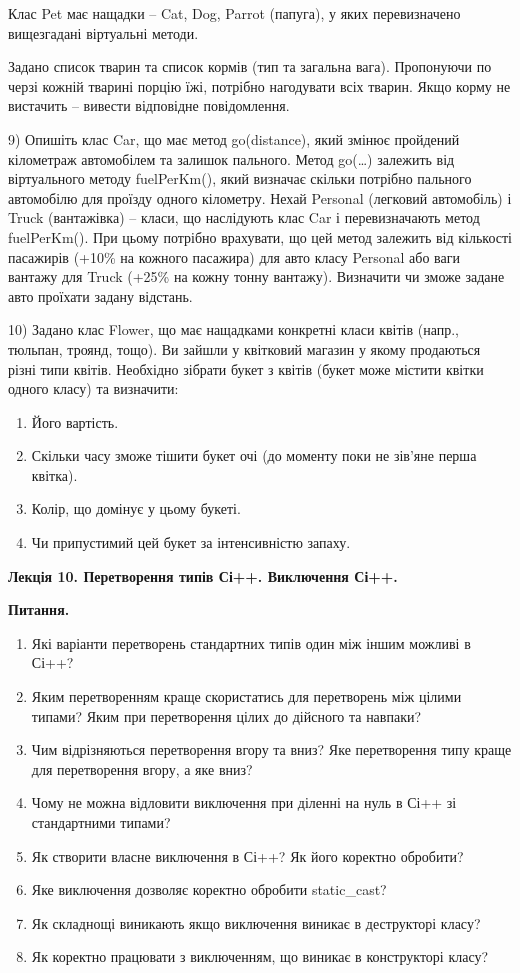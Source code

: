 \documentclass[]{article}
\begin{document}
Клас Pet має нащадки -- Cat, Dog, Parrot (папуга), у яких перевизначено
вищезгадані віртуальні методи.

Задано список тварин та список кормів (тип та загальна вага). Пропонуючи
по черзі кожній тварині порцію їжі, потрібно нагодувати всіх тварин.
Якщо корму не вистачить -- вивести відповідне повідомлення.

9) Опишіть клас Car, що має метод go(distance), який змінює пройдений
кілометраж автомобілем та залишок пального. Метод go(\ldots{}) залежить
від віртуального методу fuelPerKm(), який визначає скільки потрібно
пального автомобілю для проїзду одного кілометру. Нехай Personal
(легковий автомобіль) і Truck (вантажівка) -- класи, що наслідують клас
Car і перевизначають метод fuelPerKm(). При цьому потрібно врахувати, що
цей метод залежить від кількості пасажирів (+10\% на кожного пасажира)
для авто класу Personal або ваги вантажу для Truck (+25\% на кожну тонну
вантажу). Визначити чи зможе задане авто проїхати задану відстань.

10) Задано клас Flower, що має нащадками конкретні класи квітів (напр.,
тюльпан, троянд, тощо). Ви зайшли у квітковий магазин у якому продаються
різні типи квітів. Необхідно зібрати букет з квітів (букет може містити
квітки одного класу) та визначити:

\begin{enumerate}
\def\labelenumi{\arabic{enumi}.}
\item
  Його вартість.
\item
  Скільки часу зможе тішити букет очі (до моменту поки не зів'яне перша
  квітка).
\item
  Колір, що домінує у цьому букеті.
\item
  Чи припустимий цей букет за інтенсивністю запаху.
\end{enumerate}

\protect\hypertarget{_Hlk54461890}{}{}\textbf{Лекція 10. Перетворення
типів Сі++. Виключення Сі++.}

\protect\hypertarget{_Hlk57988995}{}{}\textbf{Питання.}

\begin{enumerate}
\def\labelenumi{\arabic{enumi})}
\item
  Які варіанти перетворень стандартних типів один між іншим можливі в
  Сі++?
\item
  Яким перетворенням краще скористатись для перетворень між цілими
  типами? Яким при перетворення цілих до дійсного та навпаки?
\item
  Чим відрізняються перетворення вгору та вниз? Яке перетворення типу
  краще для перетворення вгору, а яке вниз?
\item
  Чому не можна відловити виключення при діленні на нуль в Сі++ зі
  стандартними типами?
\item
  Як створити власне виключення в Сі++? Як його коректно обробити?
\item
  Яке виключення дозволяє коректно обробити static\_cast?
\item
  Як складнощі виникають якщо виключення виникає в деструкторі класу?
\item
  Як коректно працювати з виключенням, що виникає в конструкторі класу?
\end{enumerate}
\end{document}
